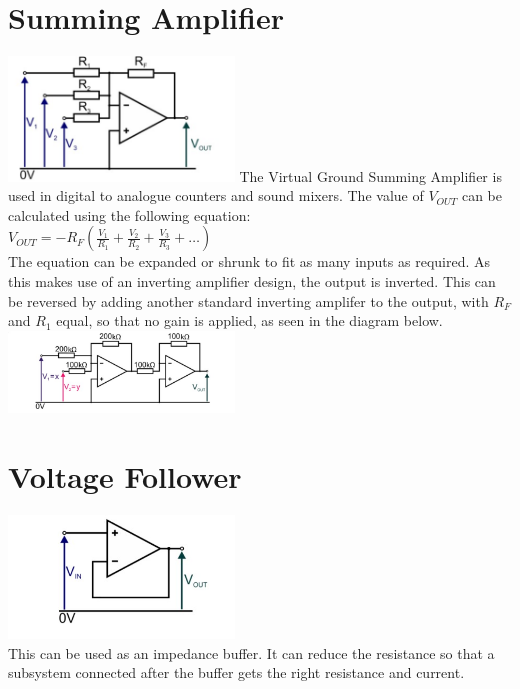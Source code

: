 \documentclass[a4paper,11pt, twocolumn]{article}
\begin{document}
\section{Summing Amplifier}
\includegraphics[width=0.45\textwidth]{summingAmp.jpg}
The Virtual Ground Summing Amplifier is used in digital to analogue counters and sound mixers. The value of $V_{OUT}$ can be calculated using the following equation:\\
$\displaystyle V_{OUT} = -R_{F} \left(\frac{V_1}{R_1}+ \frac{V_2}{R_2} + \frac{V_3}{R_3}+ \ldots \right)$\\
The equation can be expanded or shrunk to fit as many inputs as required. As this makes use of an inverting amplifier design, the output is inverted. This can be reversed by adding another standard inverting amplifer to the output, with $R_F$ and $R_1$ equal, so that no gain is applied, as seen in the diagram below.
\includegraphics[width=0.45\textwidth]{summinigAmpInverted.jpg}

\section{Voltage Follower}
\includegraphics[width=0.45\textwidth]{voltageFollower.jpg}\\
This can be used as an impedance buffer. It can reduce the resistance so that a subsystem connected after the buffer gets the right resistance and current. 
\end{document}

